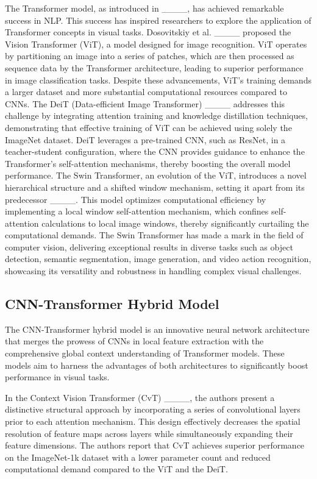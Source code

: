 The Transformer model, as introduced in ____, has achieved remarkable success in NLP.
This success has inspired researchers to explore the application of Transformer concepts in visual tasks. 
Dosovitskiy et al. ____ proposed the Vision Transformer (ViT), a model designed for image recognition.
ViT operates by partitioning an image into a series of patches, which are then processed as sequence data by the Transformer architecture, leading to superior performance in image classification tasks.
Despite these advancements, ViT's training demands a larger dataset and more substantial computational resources compared to CNNs.
The DeiT (Data-efficient Image Transformer) ____ addresses this challenge by integrating attention training and knowledge distillation techniques, 
demonstrating that effective training of ViT can be achieved using solely the ImageNet dataset.
DeiT leverages a pre-trained CNN, such as ResNet, in a teacher-student configuration, where the CNN provides guidance to enhance the Transformer's self-attention mechanisms, 
thereby boosting the overall model performance.
The Swin Transformer, an evolution of the ViT, introduces a novel hierarchical structure and a shifted window mechanism, setting it apart from its predecessor ____.
This model optimizes computational efficiency by implementing a local window self-attention mechanism, which confines self-attention calculations to local image windows, 
thereby significantly curtailing the computational demands.
The Swin Transformer has made a mark in the field of computer vision, delivering exceptional results in diverse tasks such as object detection, 
semantic segmentation, image generation, and video action recognition, showcasing its versatility and robustness in handling complex visual challenges.

\subsection{CNN-Transformer Hybrid Model}
\label{subsec:cnn_transformer_hybrid}

The CNN-Transformer hybrid model is an innovative neural network architecture that merges the prowess of CNNs in local feature extraction with the comprehensive 
global context understanding of Transformer models. These models aim to harness the advantages of both architectures to significantly boost performance in visual tasks.

In the Context Vision Transformer (CvT) ____, the authors present a distinctive structural approach by incorporating a series of convolutional layers prior 
to each attention mechanism. This design effectively decreases the spatial resolution of feature maps across layers while simultaneously expanding their feature dimensions. 
The authors report that CvT achieves superior performance on the ImageNet-1k dataset with a lower parameter count and reduced computational demand compared to 
the ViT and the DeiT.

